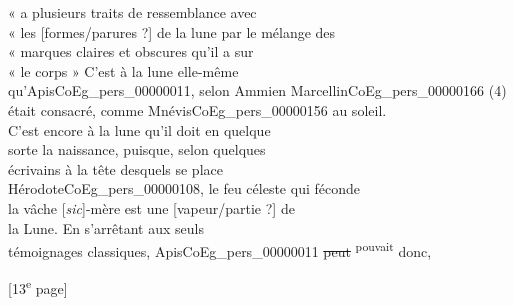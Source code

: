 \documentclass{book}
\begin{document}
{\begin{paracol}{2}
« a plusieurs traits de ressemblance avec\\
« les [formes/parures ?] de la lune par le mélange des\\
« marques claires et obscures qu’il a sur\\
« le corps » C’est à la lune elle-même\\
qu’Apis\gls{CoEg_pers_00000011}, selon Ammien Marcellin\gls{CoEg_pers_00000166} (4)
était consacré, comme Mnévis\gls{CoEg_pers_00000156} au soleil.\\
C’est encore à la lune qu’il doit en quelque\\
sorte la naissance, puisque, selon quelques\\
écrivains à la tête desquels se place\\
Hérodote\gls{CoEg_pers_00000108}, le feu céleste qui féconde\\
la vâche [\textit{sic}]-mère est une [vapeur/partie ?] de\\
la Lune. En s’arrêtant aux seuls\\
témoignages classiques, Apis\gls{CoEg_pers_00000011} \sout{peut} \textsuperscript{pouvait} donc,
\end{paracol}

{\footnotesize\begin{center} {[13\textsuperscript{e} page]}\end{center}}

}
\end{document}

